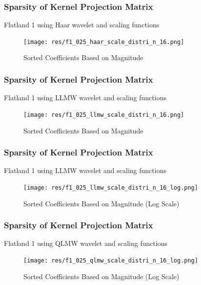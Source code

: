 \begin{frame}\frametitle{Sparsity of Kernel Projection Matrix}
Flatland 1 using Haar wavelet and scaling functions
\vspace{-2 mm}
 \begin{figure}
              \centering
              \texttt{[image: res/f1\_025\_haar\_scale\_distri\_n\_16.png]}
              \vspace{-2 mm}
              \caption{Sorted Coefficients Based on Magnitude}
              \label{fig_e_vs_n_f1}
              \end{figure}
\end{frame}

\begin{frame}\frametitle{Sparsity of Kernel Projection Matrix}
Flatland 1 using LLMW wavelet and scaling functions
\vspace{-2 mm}
 \begin{figure}
              \centering
              \texttt{[image: res/f1\_025\_llmw\_scale\_distri\_n\_16.png]}
              \vspace{-2 mm}
              \caption{Sorted Coefficients Based on Magnitude}
              \label{fig_e_vs_n_f1}
              \end{figure}
\end{frame}

\begin{frame}\frametitle{Sparsity of Kernel Projection Matrix}
Flatland 1 using LLMW wavelet and scaling functions
\vspace{-2 mm}
 \begin{figure}
              \centering
              \texttt{[image: res/f1\_025\_llmw\_scale\_distri\_n\_16\_log.png]}
              \vspace{-2 mm}
              \caption{Sorted Coefficients Based on Magnitude (Log Scale)}
              \label{fig_e_vs_n_f1}
              \end{figure}
\end{frame}

\begin{frame}\frametitle{Sparsity of Kernel Projection Matrix}
Flatland 1 using QLMW wavelet and scaling functions
\vspace{-2 mm}
 \begin{figure}
              \centering
              \texttt{[image: res/f1\_025\_qlmw\_scale\_distri\_n\_16\_log.png]}
              \vspace{-2 mm}
              \caption{Sorted Coefficients Based on Magnitude (Log Scale)}
              \label{fig_e_vs_n_f1}
              \end{figure}
\end{frame}


